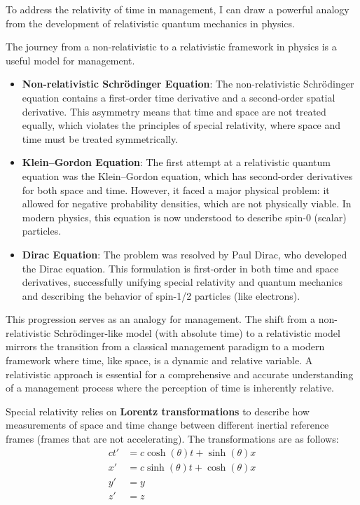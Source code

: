 \documentclass{article}
\begin{document}
 
 To address the relativity of time in management, I can draw a powerful analogy from the development of relativistic quantum mechanics in physics.
 

 
 The journey from a non-relativistic to a relativistic framework in physics is a useful model for management.
 
 \begin{itemize}
 	\item \textbf{Non-relativistic Schrödinger Equation}: The non-relativistic Schrödinger equation contains a first-order time derivative and a second-order spatial derivative. This asymmetry means that time and space are not treated equally, which violates the principles of special relativity, where space and time must be treated symmetrically.
 	\item \textbf{Klein–Gordon Equation}: The first attempt at a relativistic quantum equation was the Klein–Gordon equation, which has second-order derivatives for both space and time. However, it faced a major physical problem: it allowed for negative probability densities, which are not physically viable. In modern physics, this equation is now understood to describe spin-0 (scalar) particles.
 	\item \textbf{Dirac Equation}: The problem was resolved by Paul Dirac, who developed the Dirac equation. This formulation is first-order in both time and space derivatives, successfully unifying special relativity and quantum mechanics and describing the behavior of spin-1/2 particles (like electrons).
 \end{itemize}
 
 This progression serves as an analogy for management. The shift from a non-relativistic Schrödinger-like model (with absolute time) to a relativistic model mirrors the transition from a classical management paradigm to a modern framework where time, like space, is a dynamic and relative variable. A relativistic approach is essential for a comprehensive and accurate understanding of a management process where the perception of time is inherently relative.
 
 
 
 Special relativity relies on \textbf{Lorentz transformations} to describe how measurements of space and time change between different inertial reference frames (frames that are not accelerating). The transformations are as follows:
 \begin{align*}
 ct' &= c \cosh(\theta) t + \sinh(\theta) x \\
 x' &= c \sinh(\theta) t + \cosh(\theta) x \\
 y' &= y \\
 z' &= z
 \end{align*}
 
\end{document}
